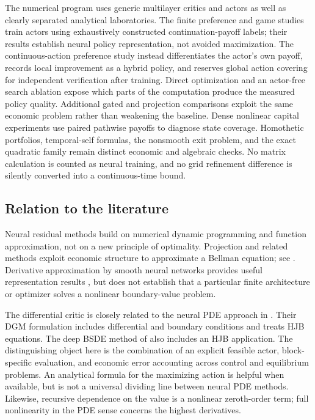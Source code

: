 \documentclass[ecta,draft]{econsocart}
\theoremstyle{definition}
\theoremstyle{remark}
\begin{document}
The numerical program uses generic multilayer critics and actors as well as clearly separated analytical laboratories. The finite preference and game studies train actors using exhaustively constructed continuation-payoff labels; their results establish neural policy representation, not avoided maximization. The continuous-action preference study instead differentiates the actor's own payoff, records local improvement as a hybrid policy, and reserves global action covering for independent verification after training. Direct optimization and an actor-free search ablation expose which parts of the computation produce the measured policy quality. Additional gated and projection comparisons exploit the same economic problem rather than weakening the baseline. Dense nonlinear capital experiments use paired pathwise payoffs to diagnose state coverage. Homothetic portfolios, temporal-self formulas, the nonsmooth exit problem, and the exact quadratic family remain distinct economic and algebraic checks. No matrix calculation is counted as neural training, and no grid refinement difference is silently converted into a continuous-time bound.

\subsection{Relation to the literature}
Neural residual methods build on numerical dynamic programming and function approximation, not on a new principle of optimality. Projection and related methods exploit economic structure to approximate a Bellman equation; see \citet{judd1998}. Derivative approximation by smooth neural networks provides useful representation results \citep{hornik1990}, but does not establish that a particular finite architecture or optimizer solves a nonlinear boundary-value problem.

The differential critic is closely related to the neural PDE approach in \citet{sirignano2018}. Their DGM formulation includes differential and boundary conditions and treats HJB equations. The deep BSDE method of \citet{han2018} also includes an HJB application. The distinguishing object here is the combination of an explicit feasible actor, block-specific evaluation, and economic error accounting across control and equilibrium problems. An analytical formula for the maximizing action is helpful when available, but is not a universal dividing line between neural PDE methods. Likewise, recursive dependence on the value is a nonlinear zeroth-order term; full nonlinearity in the PDE sense concerns the highest derivatives.
\end{document}
